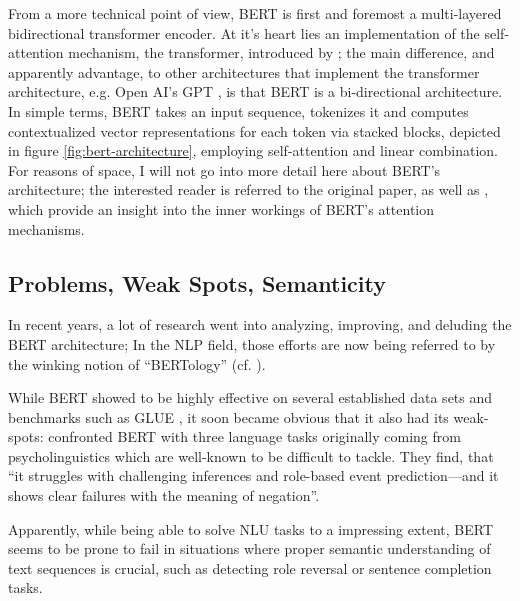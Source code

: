 From a more technical point of view, BERT is first and foremost a multi-layered bidirectional
transformer encoder. At it's heart lies an implementation of the self-attention mechanism, the
transformer, introduced by \cite{vaswani2017attention}; the main difference, and apparently
advantage, to other architectures that implement the transformer architecture, e.g. Open AI's GPT
\citep{radford2018improving}, is that BERT is a bi-directional architecture. In simple terms, BERT
takes an input sequence, tokenizes it and computes contextualized vector representations for each
token via stacked blocks, depicted in figure \ref{fig:bert-architecture}, employing self-attention
and linear combination. For reasons of space, I will not go into more detail here about BERT's
architecture; the interested reader is referred to the original paper, as well as \cite{clark2019does},
which provide an insight into the inner workings of BERT's attention mechanisms.






\subsection{Problems, Weak Spots, Semanticity}
\label{sec:problems}

In recent years, a lot of research went into analyzing, improving, and deluding
the BERT architecture; In the NLP field, those efforts are now being referred to by
the winking notion of ``BERTology'' (cf. \cite{rogers2020primer}).

While BERT showed to be highly effective on several established data sets and benchmarks such as
GLUE \citep{wang2018glue}, it soon became obvious that it also {\color{red} had} its weak-spots:
\citeauthor{ettinger2020bert} confronted BERT with three language tasks originally coming from
psycholinguistics which are well-known to be difficult to tackle. They find, that ``it struggles
with challenging inferences and role-based event prediction—and it shows clear failures with the
meaning of negation''.

Apparently, while being able to solve NLU tasks to a impressing extent, BERT seems to be prone
to fail in situations where proper semantic understanding of text sequences is crucial, such as
detecting role reversal or sentence completion tasks.

